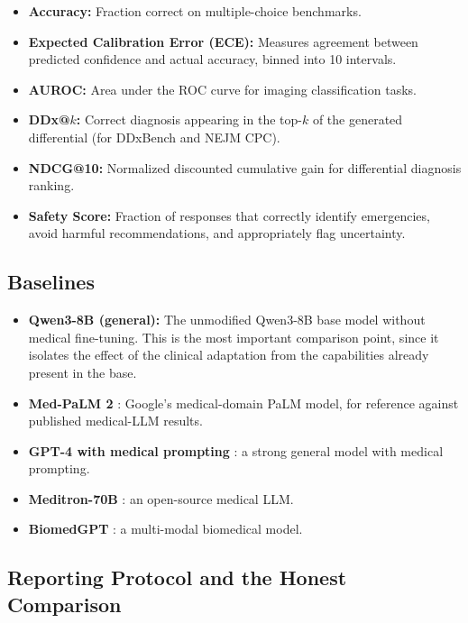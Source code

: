 \documentclass[11pt,a4paper]{article}
\begin{document}
\begin{itemize}
    \item \textbf{Accuracy:} Fraction correct on multiple-choice benchmarks.
    \item \textbf{Expected Calibration Error (ECE):} Measures agreement between predicted confidence and actual accuracy, binned into 10 intervals.
    \item \textbf{AUROC:} Area under the ROC curve for imaging classification tasks.
    \item \textbf{DDx@$k$:} Correct diagnosis appearing in the top-$k$ of the generated differential (for DDxBench and NEJM CPC).
    \item \textbf{NDCG@10:} Normalized discounted cumulative gain for differential diagnosis ranking.
    \item \textbf{Safety Score:} Fraction of responses that correctly identify emergencies, avoid harmful recommendations, and appropriately flag uncertainty.
\end{itemize}

\subsection{Baselines}

\begin{itemize}
    \item \textbf{Qwen3-8B (general):} The unmodified Qwen3-8B base model without medical fine-tuning. This is the most important comparison point, since it isolates the effect of the clinical adaptation from the capabilities already present in the base.
    \item \textbf{Med-PaLM 2} \citep{singhal2023towards}: Google's medical-domain PaLM model, for reference against published medical-LLM results.
    \item \textbf{GPT-4 with medical prompting} \citep{nori2023capabilities}: a strong general model with medical prompting.
    \item \textbf{Meditron-70B} \citep{chen2023meditron}: an open-source medical LLM.
    \item \textbf{BiomedGPT} \citep{zhang2024biomedgpt}: a multi-modal biomedical model.
\end{itemize}

\subsection{Reporting Protocol and the Honest Comparison}
\end{document}
